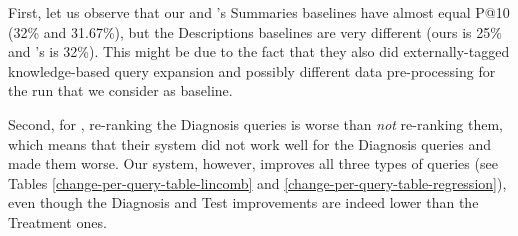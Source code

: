 \begin{table}[h!]
\centering
\caption{Comparison with previous research --- absolute P@10 percent improvements for Summaries 2014 and Descriptions 2014.}
\label{choi-comp}
\end{table}

First, let us observe that our and \cite{choi}'s Summaries baselines have almost equal P@10 (32\% and 31.67\%),
but the Descriptions baselines are very different (ours is 25\% and \cite{choi}'s is 32\%).
This might be due to the fact that they also did externally-tagged knowledge-based query expansion
and possibly different data pre-processing for the
run that we consider as baseline.

Second, for \cite{choi}, re-ranking the Diagnosis queries is worse than \emph{not} re-ranking them, which means that
their system did not work well for the Diagnosis queries and made them worse.
Our system, however, improves all three types of queries
(see Tables \ref{change-per-query-table-lincomb} and \ref{change-per-query-table-regression}),
even though the Diagnosis and Test improvements are indeed lower than the Treatment ones.

